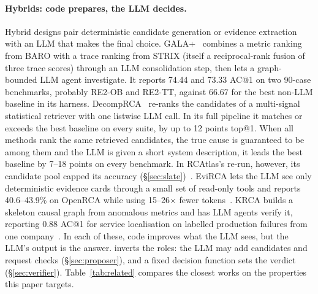\paragraph{Hybrids: code prepares, the LLM decides.}
Hybrid designs pair deterministic candidate generation or evidence extraction with an LLM that makes the final choice.
GALA+~\cite{galaplus2026} combines a metric ranking from BARO with a trace ranking from STRIX (itself a reciprocal-rank fusion of three trace scores) through an LLM consolidation step, then lets a graph-bounded LLM agent investigate. It reports 74.44 and 73.33 AC@1 on two 90-case benchmarks, probably RE2-OB and RE2-TT, against 66.67 for the best non-LLM baseline in its harness.
DecompRCA~\cite{decomprca2026} re-ranks the candidates of a multi-signal statistical retriever with one listwise LLM call. In its full pipeline it matches or exceeds the best baseline on every suite, by up to 12 points top@1. When all methods rank the same retrieved candidates, the true cause is guaranteed to be among them and the LLM is given a short system description, it leads the best baseline by 7--18 points on every benchmark.
In RCAtlas's re-run, however, its candidate pool capped its accuracy (\S\ref{sec:slate})~\cite{rcatlas2026}.
EviRCA lets the LLM see only deterministic evidence cards through a small set of read-only tools and reports 40.6--43.9\% on OpenRCA while using 15--26$\times$ fewer tokens~\cite{evirca2026}.
KRCA builds a skeleton causal graph from anomalous metrics and has LLM agents verify it, reporting 0.88 AC@1 for service localisation on labelled production failures from one company~\cite{krca2026}.
In each of these, code improves what the LLM sees, but the LLM's output is the answer.
\sys inverts the roles: the LLM may add candidates and request checks (\S\ref{sec:proposer}), and a fixed decision function sets the verdict (\S\ref{sec:verifier}).
Table~\ref{tab:related} compares the closest works on the properties this paper targets.

